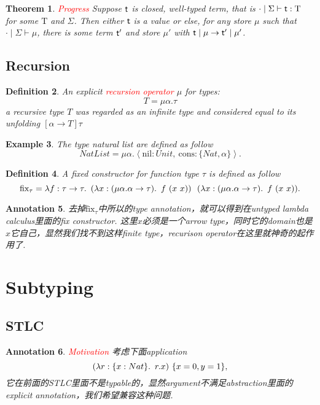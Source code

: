 \documentclass{article}
\theoremstyle{plain}
\newtheorem{theorem}{Theorem}
\newtheorem{example}[theorem]{Example}
\newtheorem{definition}[theorem]{Definition}
\newtheorem{annotation}[theorem]{Annotation}
\theoremstyle{nonumberplain}
\newcommand{\lam}[2]{\ensuremath{\lambda #1\ldotp~ #2}} %
\newcommand{\singletype}[1]{\text{#1}}
\newcommand{\termtype}[2]{\ensuremath{#1:#2}}
\newcommand{\term}[1]{\ensuremath\mathsf{#1}}
\newcommand{\redt}[1]{\textcolor{red}{#1}}
\begin{document}
\begin{theorem}
\rm \redt{Progress} Suppose $\term{t}$ is closed, well-typed term, that is $\cdot \mid \Sigma \vdash \termtype{\term{t}}{\singletype{T}}$ for some $\singletype{T}$ and $\Sigma$. Then either $\term{t}$ is a value or else, for any store $\mu$ such that $\cdot \mid \Sigma \vdash \mu$, there is some term $\term{t}'$ and store $\mu'$ with $\term{t} \mid \mu \to \term{t}' \mid \mu'$.
\end{theorem}

\newpage
\subsection{Recursion}

\begin{definition}
\rm An explicit \redt{recursion operator} $\mu$ for types:
$$
T = \mu \alpha. \tau 
$$
a recursive type $T$ was regarded as an infinite type and
considered equal to its unfolding $[\alpha \to T]\tau$
\end{definition}


\begin{example}
\rm The type natural list are defined as follow
$$
NatList = \mu \alpha. \left<\text{nil}:Unit,~\text{cons}:\{Nat,\alpha\} \right>. 
$$
\end{example}

\begin{definition}
\rm A fixed constructor for function type $\tau$ is defined as follow
$$
\text{fix}_\tau = \lam{f:\tau \to \tau}{(\lam{x:(\mu \alpha.\alpha\to \tau)}{f~(x~x)})~~(\lam{x:(\mu \alpha.\alpha\to \tau)}{f~(x~x)})}.
$$
\end{definition}


\begin{annotation}
\rm 去掉$\text{fix}_\tau$中所以的type annotation，就可以得到在untyped lambda calculus里面的fix constructor. 这里$x$必须是一个arrow type，同时它的domain也是$x$它自己，显然我们找不到这样finite type，recurison operator在这里就神奇的起作用了. 
\end{annotation}
\newpage
\section{Subtyping}

\subsection{STLC}
\begin{annotation}
\rm \redt{Motivation} 考虑下面application
$$
(\lam{\termtype{r}{\{x:Nat\}}}{r.x})~\{x=0,y=1\},
$$
它在前面的STLC里面不是typable的，显然argument不满足abstraction里面的explicit annotation，我们希望兼容这种问题. 
\end{annotation}
\end{document}
